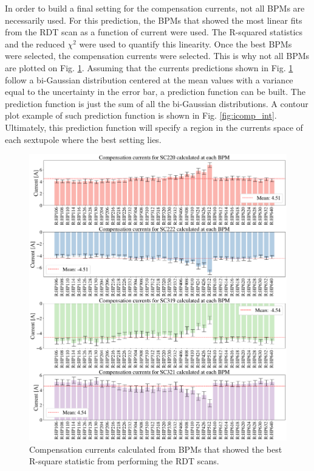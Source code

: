 In order to build a final setting for the compensation currents, not all BPMs are necessarily used. For this prediction, the BPMs that showed the most linear fits from the RDT scan as a function of current were used. The R-squared statistics and the reduced $\chi^2$ were used to quantify this linearity. Once the best BPMs were selected, the compensation currents were selected. This is why not all BPMs are plotted on Fig. \ref{fig:icomp}. Assuming that the currents predictions shown in Fig. \ref{fig:icomp} follow a bi-Gaussian distribution centered at the mean values with a variance equal to the uncertainty in the error bar, a prediction function can be built. The prediction function is just the sum of all the bi-Gaussian distributions. A contour plot example of such prediction function is shown in Fig. \ref{fig:icomp_int}. Ultimately, this prediction function will specify a region in the currents space of each sextupole where the best setting lies.

\begin{figure}[H]
    \centering
    \includegraphics[width=\columnwidth]{chapter4/comp_currents.png}
    \caption{Compensation currents calculated from BPMs that showed the best R-square statistic from performing the RDT scans.}
    \label{fig:icomp}
\end{figure}

